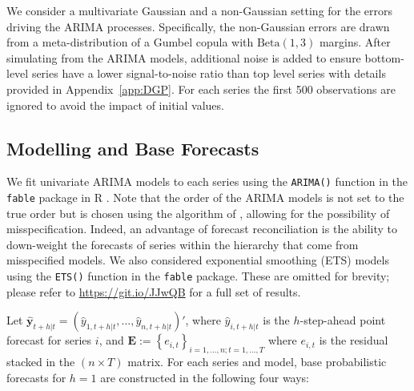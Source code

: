 \documentclass[11pt]{article}
\theoremstyle{definition}
\begin{document}
We consider a multivariate Gaussian and a non-Gaussian setting for the errors driving the ARIMA processes. Specifically, the non-Gaussian errors are drawn from a meta-distribution of a Gumbel copula with $\text{Beta}(1,3)$ margins. After simulating from the ARIMA models, additional noise is added to ensure bottom-level series have a lower signal-to-noise ratio than top level series with details provided in Appendix~\ref{app:DGP}. For each series the first 500 observations are ignored to avoid the impact of initial values.


\subsection{Modelling and Base Forecasts}

We fit univariate ARIMA models to each series using the \verb|ARIMA()| function in the \verb|fable| package \citep{Rfable} in R \citep{Rcore}. Note that the order of the ARIMA models is not set to the true order but is chosen using the algorithm of \cite{HynKha2008}, allowing for the possibility of misspecification. Indeed, an advantage of forecast reconciliation is the ability to down-weight the forecasts of series within the hierarchy that come from misspecified models. We also considered exponential smoothing (ETS) models using the \verb|ETS()| function in the \verb|fable| package. These are omitted for brevity; please refer to \url{https://git.io/JJwQB} for a full set of results.

Let $\hat{\bm{y}}_{t+h|t}=\left(\hat{y}_{1,t+h|t},\ldots,\hat{y}_{n,t+h|t}\right)'$, where $\hat{y}_{i,t+h|t}$ is the $h$-step-ahead point forecast for series $i$, and $\bm{E}:=\left\{e_{i,t}\right\}_{i=1,\dots,n;t=1,\dots,T}$ where $e_{i,t}$ is the residual stacked in the $(n \times T)$ matrix. For each series and model, base probabilistic forecasts for $h=1$ are constructed in the following four ways:
\end{document}

